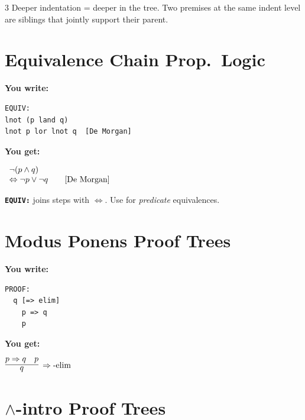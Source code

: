 \documentclass[10pt,landscape,a4paper]{article}
\newcommand{\kw}[1]{\texttt{\bfseries #1}}
\newenvironment{exwrite}%
  {\par\noindent\scriptsize\textbf{You write:}\par\vspace{0pt}\scriptsize}%
  {\vspace{1pt}}
\newenvironment{exget}%
  {\par\noindent\scriptsize\textbf{You get:}\par\vspace{0pt}\small}%
  {\par\vspace{3pt}}
\begin{document}
\begin{multicols}{3}
{\smallskip
Deeper indentation = deeper in the tree. Two premises at the same indent level are siblings that jointly support their parent.
}

\section{Equivalence Chain {\normalsize\color{gray}\textrm{\scriptsize Prop.\ Logic}}}

\begin{exwrite}%
\begin{verbatim}
EQUIV:
lnot (p land q)
lnot p lor lnot q  [De Morgan]
\end{verbatim}
\end{exwrite}
\begin{exget}%
\begin{center}
$\begin{array}{l@{\hspace{2em}}r}
\lnot (p \land q) \\
\Leftrightarrow \lnot p \lor \lnot q
  & [\mbox{De Morgan}]
\end{array}$
\end{center}
\end{exget}

{\scriptsize \kw{EQUIV:} joins steps with $\Leftrightarrow$. Use for \emph{predicate} equivalences.}


\section{Modus Ponens {\normalsize\color{gray}\textrm{\scriptsize Proof Trees}}}

\begin{exwrite}%
\begin{verbatim}
PROOF:
  q [=> elim]
    p => q
    p
\end{verbatim}
\end{exwrite}
\begin{exget}%
\begin{center}
$\infer[\Rightarrow\textrm{-elim}]{q}{p \Rightarrow q & p}$
\end{center}
\end{exget}

\section{$\land$-intro {\normalsize\color{gray}\textrm{\scriptsize Proof Trees}}}


\end{multicols}
\end{document}
